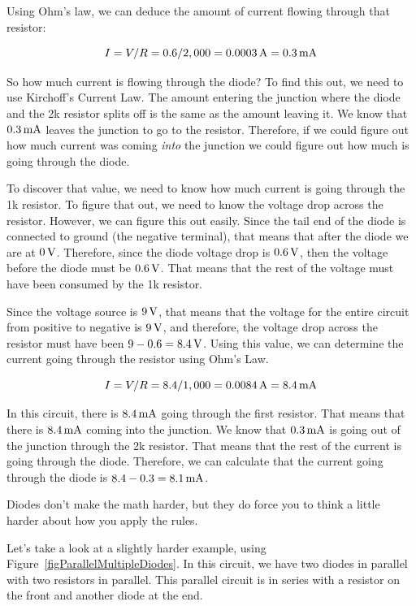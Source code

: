 Using Ohm's law, we can deduce the amount of current flowing through that resistor:

$$ I = V / R = 0.6 / 2,000 = 0.0003\,\si{\ampere} = 0.3\,\si{\milli\ampere} $$

So how much current is flowing through the diode?
To find this out, we need to use Kirchoff's Current Law.
The amount entering the junction where the diode and the 2k resistor splits off is the same as the amount leaving it.
We know that $0.3\,\si{\milli\ampere}$ leaves the junction to go to the resistor.
Therefore, if we could figure out how much current was coming \emph{into} the junction we could figure out how much is going through the diode.

To discover that value, we need to know how much current is going through the 1k resistor.
To figure that out, we need to know the voltage drop across the resistor.
However, we can figure this out easily.  
Since the tail end of the diode is connected to ground (the negative terminal), that means that after the diode we are at $0\,\si{\volt}$.  
Therefore, since the diode voltage drop is $0.6\,\si{\volt}$, then the voltage before the diode must be $0.6\,\si{\volt}$.
That means that the rest of the voltage must have been consumed by the 1k resistor.

Since the voltage source is $9\,\si{\volt}$, that means that the voltage for the entire circuit from positive to negative is $9\,\si{\volt}$, and therefore, the voltage drop across the resistor must have been $9 - 0.6 = 8.4\,\si{\volt}$.
Using this value, we can determine the current going through the resistor using Ohm's Law.

$$ I = V / R = 8.4 / 1,000 = 0.0084\,\si{\ampere} = 8.4\,\si{\milli\ampere} $$

In this circuit, there is $8.4\,\si{\milli\ampere}$ going through the first resistor.
That means that there is $8.4\,\si{\milli\ampere}$ coming into the junction.
We know that $0.3\,\si{\milli\ampere}$ is going out of the junction through the 2k resistor.
That means that the rest of the current is going through the diode.
Therefore, we can calculate that the current going through the diode is $8.4 - 0.3 = 8.1\,\si{\milli\ampere}$.

Diodes don't make the math harder, but they do force you to think a little harder about how you apply the rules.

Let's take a look at a slightly harder example, using Figure~\ref{figParallelMultipleDiodes}.
In this circuit, we have two diodes in parallel with two resistors in parallel.
This parallel circuit is in series with a resistor on the front and another diode at the end. 

